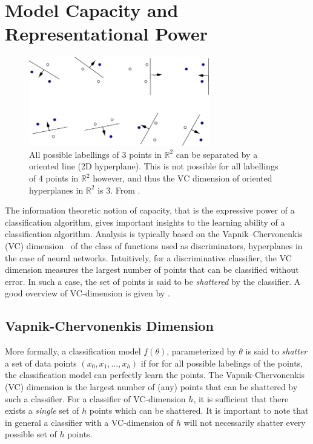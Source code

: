 \documentclass[thesis]{subfiles}
\begin{document}
    \section{Model Capacity and Representational Power}
    \begin{figure}
        \centering
        \includegraphics[width=0.7\textwidth]{Figs/PDF/vcdim_r2lines}
        \caption{All possible labellings of 3 points in $\mathbb{R}^2$ can be separated by a oriented line (2D hyperplane). This is not possible for all labellings of 4 points in $\mathbb{R}^2$ however, and thus the VC dimension of oriented hyperplanes in $\mathbb{R}^2$ is 3. From \citet{burges1998tutorial}.}
        \label{fig:vcdim_r2line}
    \end{figure}
    The information theoretic notion of capacity, that is the expressive power of a classification algorithm, gives important insights to the learning ability of a classification algorithm. Analysis is typically based on the Vapnik–Chervonenkis (VC) dimension~\citep{vapnik2015uniform} of the class of functions used as discriminators, \eg hyperplanes in the case of neural networks. Intuitively, for a discriminative classifier, the VC dimension measures the largest number of points that can be classified without error. In such a case, the set of points is said to be \emph{shattered} by the classifier. A good overview of VC-dimension is given by \citet{burges1998tutorial}.
    
    \subsection{Vapnik-Chervonenkis Dimension}
    More formally, a classification model $f(\theta)$, parameterized by $\theta$ is said to \emph{shatter} a set of data points $(x_0, x_1, \ldots, x_h)$ if for for all possible labelings of the points, the classification model can perfectly learn the points. The Vapnik-Chervonenkis (VC) dimension is the largest number of (any) points that can be shattered by such a classifier. For a classifier of VC-dimension $h$, it is sufficient that there exists a \emph{single} set of $h$ points which can be shattered. It is important to note that in general a classifier with a VC-dimension of $h$ will not necessarily shatter every possible set of $h$ points. 
    
\end{document}
